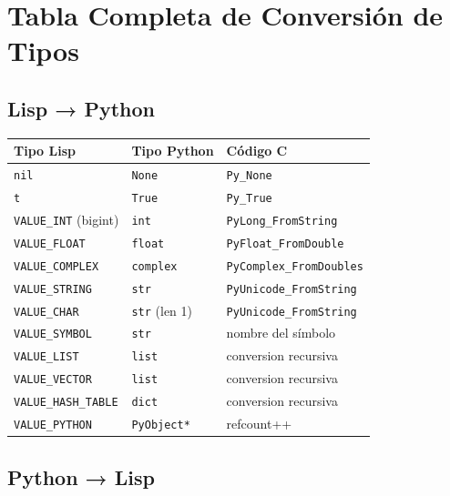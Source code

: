 \chapter{Tabla Completa de Conversión de Tipos}
\label{app:type-conversion}

\section*{Lisp → Python}

\begin{center}
\begin{tabular}{lll}
\toprule
\textbf{Tipo Lisp} & \textbf{Tipo Python} & \textbf{Código C} \\
\midrule
\texttt{nil} & \texttt{None} & \texttt{Py\_None} \\
\texttt{t} & \texttt{True} & \texttt{Py\_True} \\
\texttt{VALUE\_INT} (bigint) & \texttt{int} & \texttt{PyLong\_FromString} \\
\texttt{VALUE\_FLOAT} & \texttt{float} & \texttt{PyFloat\_FromDouble} \\
\texttt{VALUE\_COMPLEX} & \texttt{complex} & \texttt{PyComplex\_FromDoubles} \\
\texttt{VALUE\_STRING} & \texttt{str} & \texttt{PyUnicode\_FromString} \\
\texttt{VALUE\_CHAR} & \texttt{str} (len 1) & \texttt{PyUnicode\_FromString} \\
\texttt{VALUE\_SYMBOL} & \texttt{str} & nombre del símbolo \\
\texttt{VALUE\_LIST} & \texttt{list} & conversion recursiva \\
\texttt{VALUE\_VECTOR} & \texttt{list} & conversion recursiva \\
\texttt{VALUE\_HASH\_TABLE} & \texttt{dict} & conversion recursiva \\
\texttt{VALUE\_PYTHON} & \texttt{PyObject*} & refcount++ \\
\bottomrule
\end{tabular}
\end{center}

\section*{Python → Lisp}

